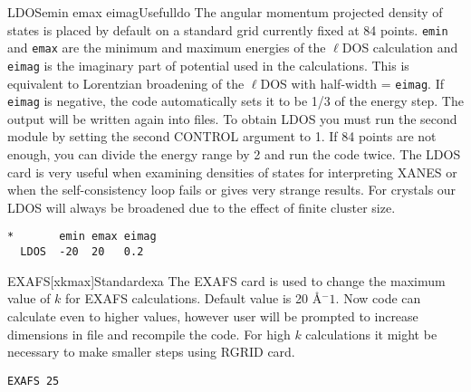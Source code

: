 \documentclass[11pt,oneside]{report} %
\begin{document}
\begin{Card}{LDOS}{emin   emax   eimag}{Useful}{ldo}
  The angular momentum projected density of states is placed by
  default on a standard grid currently fixed at 84 points.  \texttt{emin} and
  \texttt{emax} are the minimum and maximum energies of the $\ell$DOS
  calculation and \texttt{eimag} is the imaginary part of potential
  used in the calculations.  This is equivalent to Lorentzian
  broadening of the $\ell$DOS with half-width = \texttt{eimag}.  If
  \texttt{eimag} is negative, the code automatically sets it to be 1/3
  of the energy step.  The output will be written again into
   files. To obtain LDOS you must run the second module by
  setting the second CONTROL argument to 1.  If 84 points are not
  enough, you can divide the energy range by 2 and run the code twice.
  The LDOS card is very useful when examining densities of states for
  interpreting XANES or when the self-consistency loop fails or gives
  very strange results.  For crystals our LDOS will always
  be broadened due to the effect of finite cluster size.
\begin{verbatim}
*       emin emax eimag
  LDOS  -20  20   0.2
\end{verbatim}
\end{Card}

\begin{Card}{EXAFS}{[xkmax]}{Standard}{exa}
  The EXAFS card is used to change the maximum value of $k$ for
EXAFS calculations.  Default value is 20 \AA$^-1$. Now code can calculate
even to higher values, however user will be prompted to increase
dimensions in  file and recompile the code.
For high $k$ calculations it might be necessary to make smaller steps
using RGRID card.
\begin{verbatim}
EXAFS 25
\end{verbatim}
\end{Card}
\end{document}
